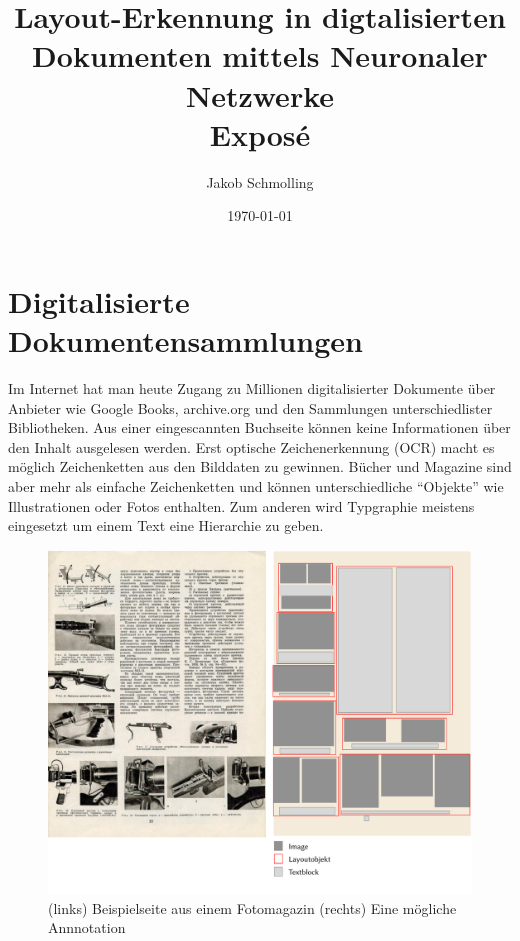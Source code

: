 \documentclass[nohyper,nobib]{tufte-handout}
\author{Jakob Schmolling}
\date{\today}
\title{
Layout-Erkennung in digtalisierten Dokumenten mittels Neuronaler Netzwerke\\
\small{Exposé}
}
\begin{document}
\maketitle

\section{Digitalisierte Dokumentensammlungen}
Im Internet hat man heute Zugang zu Millionen digitalisierter Dokumente über Anbieter wie Google Books, archive.org und den Sammlungen unterschiedlister Bibliotheken. 
Aus einer eingescannten Buchseite können keine Informationen über den Inhalt ausgelesen werden.
Erst optische Zeichenerkennung (OCR) macht es möglich Zeichenketten aus den Bilddaten zu gewinnen.
Bücher und Magazine sind aber mehr als einfache Zeichenketten und können unterschiedliche ``Objekte'' wie Illustrationen oder Fotos enthalten.
Zum anderen wird Typgraphie meistens eingesetzt um einem Text eine Hierarchie zu geben. 

\begin{figure}
\includegraphics[width=\textwidth,keepaspectratio]{figures/img/annotation_beispiel1.pdf}
\caption{ (links) Beispielseite aus einem Fotomagazin \cite{__1967}
          (rechts) Eine mögliche Annnotation}
\end{figure}
\end{document}
